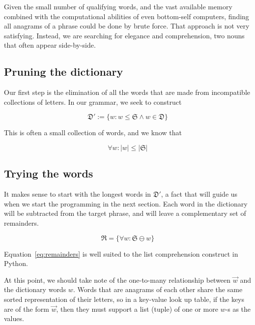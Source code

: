 \documentclass[letterpaper, 11pt]{article}
\newcommand{\Dp}{$\mathfrak{D}'$\xspace}
\newcommand{\w}{$w$\xspace}
\newcommand{\aw}{$\overrightarrow{w}$\xspace}
\begin{document}
Given the small number of qualifying words, and the vast available
memory combined with the computational abilities of even bottom-self
computers, finding all anagrams of a phrase could be done by brute
force. That approach is not very satisfying. Instead, we are searching
for elegance and comprehension, two nouns that often appear
side-by-side.

\subsection{Pruning the dictionary}

Our first step is the elimination of all the words that are made
from incompatible collections of letters. In our grammar, we seek
to construct

\begin{equation}
\label{eq:deriveddictionaries}
\mathfrak{D}' := \{w:w \leq \mathfrak{S} \wedge w \in \mathfrak{D}\}
\end{equation}

This is often a small collection of words, and we know that 

\begin{equation}
\label{eq:wordlength}
\forall w: |w| \leq |\mathfrak{S}|
\end{equation}


\subsection{Trying the words}

It makes sense to start with the longest words in \Dp, a fact that
will guide us when we start the programming in the next section.
Each word in the dictionary will be subtracted from the target
phrase, and will leave a complementary set of remainders.

\begin{equation}
\label{eq:remainders}
\mathfrak{R} = \{\forall w : \mathfrak{S} \ominus w \}
\end{equation}

Equation~\ref{eq:remainders} is well suited to the list comprehension
construct in Python.

At this point, we should take note of the one-to-many relationship
between \aw and the dictionary words \w. Words that are anagrams
of each other share the same sorted representation of their letters,
so in a key-value look up table, if the keys are of the form \aw,
then they must support a list (tuple) of one or more \w-s as the
values.
\end{document}
